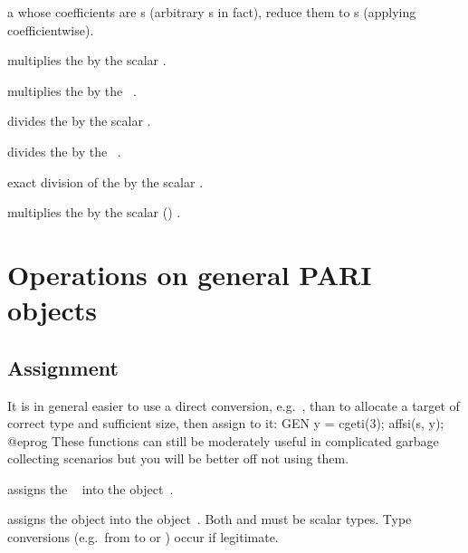   a  whose
coefficients are s (arbitrary s in fact), reduce them to
s (applying  coefficientwise).


 multiplies the  
by the scalar .

 multiplies the  
by the ~.

 divides the  
by the scalar .

 divides the  
by the ~.

 exact division of the 
 by the scalar .

 multiplies the 
 by the scalar () .





\newpage
\chapter{Operations on general PARI objects}

\section{Assignment}

It is in general easier to use a direct conversion,
e.g.~, than to allocate a target of correct type and
sufficient size, then assign to it:
\bprog
  GEN y = cgeti(3); affsi(s, y);
@eprog\noindent
These functions can still be moderately useful in complicated garbage
collecting scenarios but you will be better off not using them.

 assigns the ~ into the
object~.

 assigns the object  into the
object~. Both  and  must be scalar types. Type
conversions (e.g.~from  to  or ) occur if
legitimate.

